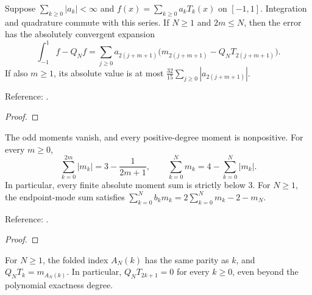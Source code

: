 \begin{supporting}

\begin{theorem}
\label{thm:cc-even-tail}
\leanok
Suppose $\sum_{k\ge0}|a_k|<\infty$ and $f(x)=\sum_{k\ge0}a_kT_k(x)$
on $[-1,1]$. Integration and quadrature commute with this series.
If $N\ge1$ and $2m\le N$, then the error has the absolutely convergent expansion
\[
 \int_{-1}^1 f-Q_Nf
 =\sum_{j\ge0} a_{2(j+m+1)}\bigl(m_{2(j+m+1)}-Q_NT_{2(j+m+1)}\bigr).
\]
If also $m\ge1$, its absolute value is at most
$\frac{32}{15}\sum_{j\ge0}|a_{2(j+m+1)}|$.

Reference: \cite[proof of Theorem 19.3]{atap}.
\end{theorem}
\begin{proof}
\leanok
\end{proof}

\begin{theorem}
\label{thm:cc-moment-sums}
\leanok
The odd moments vanish, and every positive-degree moment is nonpositive.
For every $m\ge0$,
\[
 \sum_{k=0}^{2m}|m_k|=3-\frac1{2m+1},\qquad
 \sum_{k=0}^Nm_k=4-\sum_{k=0}^N|m_k|.
\]
In particular, every finite absolute moment sum is strictly below $3$.
For $N\ge1$, the endpoint-mode sum satisfies
$\sum_{k=0}^Nb_km_k=2\sum_{k=0}^Nm_k-2-m_N$.

Reference: \cite[equation (19.6)]{atap}.
\end{theorem}
\begin{proof}
\leanok
\end{proof}

\begin{theorem}
\label{thm:cc-mode-aliasing}
\leanok
For $N\ge1$, the folded index $A_N(k)$ has the same parity as $k$, and
$Q_NT_k=m_{A_N(k)}$. In particular, $Q_NT_{2k+1}=0$ for every $k\ge0$,
even beyond the polynomial exactness degree.


\end{theorem}
\end{supporting}
